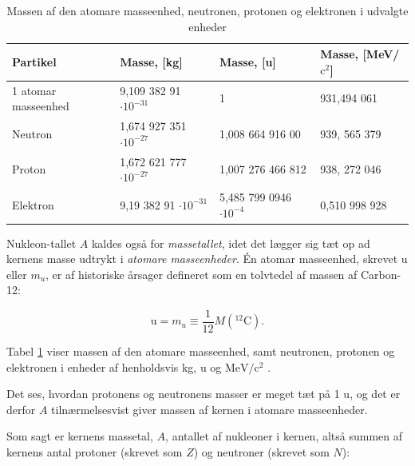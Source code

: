 \begin{table}
    \begin{tabular}{l|l|l|l}
    Partikel            & Masse, [kg]                      & Masse, [u]                       & Masse, [MeV/$\text{c}^2$] \\ \hline
    1 atomar masseenhed & 9,109 382 91 $\cdot 10^{-31}$   & 1                                & 931,494 061               \\
    Neutron             & 1,674 927 351 $\cdot 10^{-27} $ & 1,008 664 916 00                 & 939, 565 379              \\
    Proton              & 1,672 621 777 $\cdot 10^{-27}$  & 1,007 276 466 812                & 938, 272 046              \\
    Elektron            & 9,19 382 91 $\cdot 10^{-31}$    & 5,485 799 0946  $\cdot 10^{-4}$ & 0,510 998 928             \\
    \end{tabular}
    \caption{Massen af den atomare masseenhed, neutronen, protonen og elektronen i udvalgte enheder}
    \label{tab:masser}
\end{table}

Nukleon-tallet $A$ kaldes også for \emph{massetallet}, idet det lægger sig tæt op ad kernens masse udtrykt i \emph{atomare masseenheder}. Én atomar masseenhed, skrevet u eller $m_u$, er af historiske årsager defineret som en tolvtedel af massen af Carbon-12:

\begin{equation}
\text{u} = m_u \equiv \frac{1}{12} M(^{12}\text{C}).
\label{eq:u}
\end{equation} 

Tabel \ref{tab:masser} viser massen af den atomare masseenhed, samt neutronen, protonen og elektronen i enheder af henholdsvis kg, u og $\text{MeV}/\text{c}^2$ \footnotemark .


Det ses, hvordan protonens og neutronens masser er meget tæt på 1 u, og det er derfor $A$ tilnærmelsesvist giver massen af kernen i atomare masseenheder.

Som sagt er kernens massetal, $A$, antallet af nukleoner i kernen, altså summen af kernens antal protoner (skrevet som $Z$) og neutroner (skrevet som $N$):

